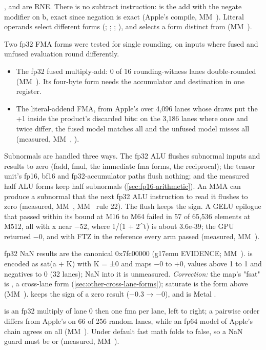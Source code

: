,  and  are RNE. There is no subtract instruction:  is the add with the negate modifier on b, exact since negation is exact
(Apple's compile, MM~). Literal operands select different forms (; ; ; ), and  selects a form distinct from  (MM~).

Two fp32 FMA forms were tested for single rounding, on inputs where fused and unfused evaluation round differently.

\begin{itemize}
\item The fp32 fused multiply-add: 0 of 16 rounding-witness lanes double-rounded (MM~). Its four-byte form needs the
  accumulator and destination in one register.
\item The literal-addend FMA, from Apple's  over 4,096 lanes whose draws put the +1 inside
  the product's discarded bits: on the 3,186 lanes where once and twice differ, the fused model matches all and the
  unfused model misses all (measured, MM~, ).
\end{itemize}

Subnormals are handled three ways. The fp32 ALU flushes subnormal inputs and results to zero (fadd, fmul, the immediate fma
forms, the reciprocal); the tensor unit's fp16, bf16 and fp32-accumulator paths flush nothing; and the measured half ALU
forms keep half subnormals (\cref{sec:fp16-arithmetic}). An MMA can produce a subnormal that the next fp32 ALU
instruction to read it flushes to zero (measured, MM~, MM~ rule 22). The flush keeps the sign. A GELU epilogue that passed within its
bound at M16 to M64 failed in 57 of 65,536 elements at M512, all with x near −52, where 1/(1 + 2\^{}t) is about 3.6e-39;
the GPU returned −0, and with FTZ in the reference every arm passed (measured, MM~).

fp32 NaN results are the canonical 0x7fc00000 (g17emu EVIDENCE; MM~). 
is encoded as sat(a + K) with K = ±0 and maps −0 to +0, values above 1 to 1 and negatives to 0 (32 lanes); NaN into it is
unmeasured. \emph{Correction:} the map's "fsat" is , a cross-lane form (\cref{sec:other-cross-lane-forms});
saturate is the form above (MM~).  keeps the sign of a zero result (−0.3 → −0), and  is Metal .

 is an fp32 multiply of lane 0 then one fma per lane, left to right; a
pairwise order differs from Apple's on 66 of 256 random lanes, while an fp64 model of Apple's chain agrees on all (MM~).
Under default fast math  folds to false, so a NaN guard must be  or
 (measured, MM~).

